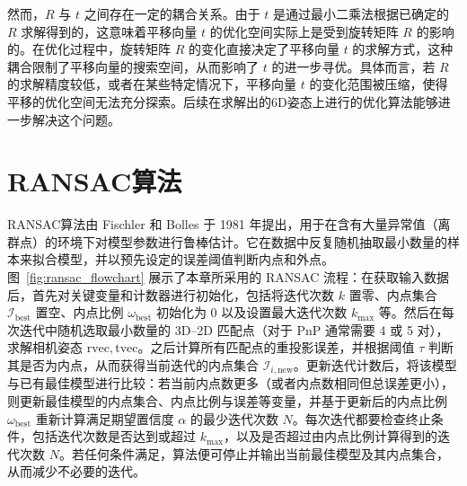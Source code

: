 然而，$R$ 与 $t$ 之间存在一定的耦合关系。由于 $t$ 是通过最小二乘法根据已确定的 $R$ 求解得到的，这意味着平移向量 $t$ 的优化空间实际上是受到旋转矩阵 $R$ 的影响的。在优化过程中，旋转矩阵 $R$ 的变化直接决定了平移向量 $t$ 的求解方式，这种耦合限制了平移向量的搜索空间，从而影响了 $t$ 的进一步寻优。具体而言，若 $R$ 的求解精度较低，或者在某些特定情况下，平移向量 $t$ 的变化范围被压缩，使得平移的优化空间无法充分探索。后续在求解出的6D姿态上进行的优化算法能够进一步解决这个问题。



\section{RANSAC算法}
\label{sec:ransac_pnp}

RANSAC算法由 Fischler 和 Bolles 于 1981 年提出，用于在含有大量异常值（离群点）的环境下对模型参数进行鲁棒估计。它在数据中反复随机抽取最小数量的样本来拟合模型，并以预先设定的误差阈值判断内点和外点。图~\ref{fig:ransac_flowchart} 展示了本章所采用的 RANSAC 流程：在获取输入数据后，首先对关键变量和计数器进行初始化，包括将迭代次数 \(k\) 置零、内点集合 \(\mathcal{I}_{\text{best}}\) 置空、内点比例 \(\omega_{\text{best}}\) 初始化为 0 以及设置最大迭代次数 \(k_{\max}\) 等。然后在每次迭代中随机选取最小数量的 3D--2D 匹配点（对于 PnP 通常需要 4 或 5 对），求解相机姿态 \(\mathrm{rvec}, \mathrm{tvec}\)。之后计算所有匹配点的重投影误差，并根据阈值 \(\tau\) 判断其是否为内点，从而获得当前迭代的内点集合 \(\mathcal{I}_{i,\text{new}}\)。更新迭代计数后，将该模型与已有最佳模型进行比较：若当前内点数更多（或者内点数相同但总误差更小），则更新最佳模型的内点集合、内点比例与误差等变量，并基于更新后的内点比例 \(\omega_{\text{best}}\) 重新计算满足期望置信度 \(\alpha\) 的最少迭代次数 \(N\)。每次迭代都要检查终止条件，包括迭代次数是否达到或超过 \(k_{\max}\)，以及是否超过由内点比例计算得到的迭代次数 \(N\)。若任何条件满足，算法便可停止并输出当前最佳模型及其内点集合，从而减少不必要的迭代。


